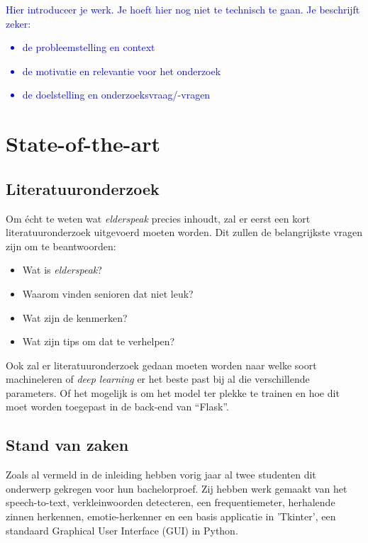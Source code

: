 \textcolor{blue}{Hier introduceer je werk. Je hoeft hier nog niet te technisch te gaan.
Je beschrijft zeker:
\begin{itemize}
  \item de probleemstelling en context
  \item de motivatie en relevantie voor het onderzoek
  \item de doelstelling en onderzoeksvraag/-vragen
\end{itemize}}



\section{State-of-the-art}
\label{sec:state-of-the-art}

\subsection{Literatuuronderzoek}
\label{sec:literatuuronderzoek}
Om écht te weten wat \textit{elderspeak} precies inhoudt, zal er eerst een kort literatuuronderzoek uitgevoerd moeten worden. Dit zullen de belangrijkste vragen zijn om te beantwoorden:
\begin{itemize}
	\item Wat is \textit{elderspeak}?
	\item Waarom vinden senioren dat niet leuk?
	\item Wat zijn de kenmerken?
	\item Wat zijn tips om dat te verhelpen?
\end{itemize}

Ook zal er literatuuronderzoek gedaan moeten worden naar welke soort machineleren of \textit{deep learning} er het beste past bij al die verschillende parameters. Of het mogelijk is om het model ter plekke te trainen en hoe dit moet worden toegepast in de back-end van ``Flask''.

\subsection{Stand van zaken}
\label{sec:stand-van-zaken}
Zoals al vermeld in de inleiding hebben vorig jaar al twee studenten dit onderwerp gekregen voor hun bachelorproef. Zij hebben werk gemaakt van het speech-to-text, verkleinwoorden detecteren, een frequentiemeter, herhalende zinnen herkennen, emotie-herkenner en een basis applicatie in 'Tkinter', een standaard Graphical User Interface (GUI) in Python.

